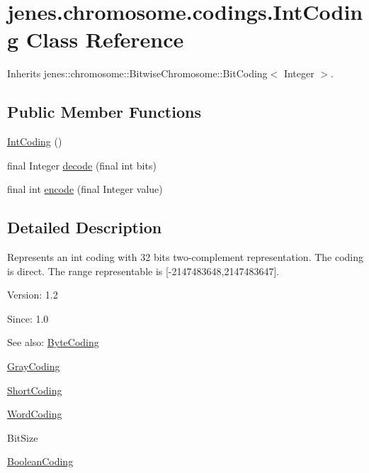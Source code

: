 \hypertarget{classjenes_1_1chromosome_1_1codings_1_1_int_coding}{
\section{jenes.chromosome.codings.IntCoding Class Reference}
\label{classjenes_1_1chromosome_1_1codings_1_1_int_coding}
}
Inherits jenes::chromosome::BitwiseChromosome::BitCoding$<$ Integer $>$.

\subsection*{Public Member Functions}
\begin{CompactItemize}
\item 
\hyperlink{classjenes_1_1chromosome_1_1codings_1_1_int_coding_f99166e5452fdf789dc235ce473872c9}{IntCoding} ()
\item 
final Integer \hyperlink{classjenes_1_1chromosome_1_1codings_1_1_int_coding_2097eb05c6efc1572e07d23709f2f4f7}{decode} (final int bits)
\item 
final int \hyperlink{classjenes_1_1chromosome_1_1codings_1_1_int_coding_b320730ca00ec9be8d2e7e52f3bdb8eb}{encode} (final Integer value)
\end{CompactItemize}


\subsection{Detailed Description}
Represents an int coding with 32 bits two-complement representation. The coding is direct. The range representable is \mbox{[}-2147483648,2147483647\mbox{]}.

\begin{Desc}
\item[Version:]1.2 \end{Desc}
\begin{Desc}
\item[Since:]1.0\end{Desc}
\begin{Desc}
\item[See also:]\hyperlink{classjenes_1_1chromosome_1_1codings_1_1_byte_coding}{ByteCoding} 

\hyperlink{classjenes_1_1chromosome_1_1codings_1_1_gray_coding}{GrayCoding} 

\hyperlink{classjenes_1_1chromosome_1_1codings_1_1_short_coding}{ShortCoding} 

\hyperlink{classjenes_1_1chromosome_1_1codings_1_1_word_coding}{WordCoding} 

BitSize 

\hyperlink{classjenes_1_1chromosome_1_1codings_1_1_boolean_coding}{BooleanCoding} \end{Desc}


